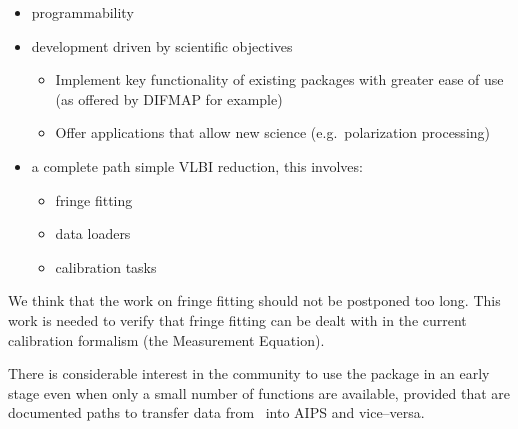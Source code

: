 \begin{itemize}

\item programmability

\item development driven by scientific objectives

  \begin{itemize}
    
  \item Implement key functionality of existing packages with greater
    ease of use (as offered by DIFMAP for example)

  \item Offer applications that allow new science (e.g.\ polarization 
    processing)

  \end{itemize}

\item a complete path simple VLBI reduction, this involves:

  \begin{itemize}
  
  \item fringe fitting

  \item data loaders

  \item calibration tasks

  \end{itemize}

\end{itemize}

\noindent
We think that the work on fringe fitting should not be postponed too
long. This work is needed to verify that fringe fitting can be dealt
with in the current calibration formalism (the Measurement Equation).

There is considerable interest in the community to use the package in
an early stage even when only a small number of functions are
available, provided that are documented paths to transfer data from
\aipspp\ into AIPS and vice--versa.

%
